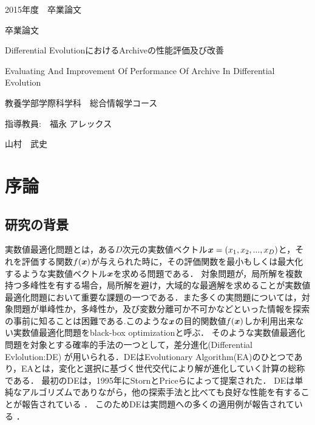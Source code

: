 \documentclass[a4paper,11pt,oneside,openany]{jsbook}
\def\vector#1{\mbox{\boldmath $#1$}}
\begin{document}
\thispagestyle{empty}
2015年度　卒業論文%
\bigskip%
\LARGE%
\begin{center}
卒業論文
\end{center}
\bigskip\bigskip\bigskip\bigskip\bigskip\bigskip\bigskip %
\begin{center} %
Differential EvolutionにおけるArchiveの性能評価及び改善
\end{center}
\large %
\begin{center}
Evaluating And Improvement Of Performance Of Archive In Differential Evolution
\end{center}
\bigskip\bigskip\bigskip\bigskip\bigskip\bigskip\bigskip\bigskip\bigskip\bigskip
\bigskip\bigskip\bigskip\bigskip\bigskip\bigskip\bigskip\bigskip\bigskip
\Large %
\begin{center}
教養学部学際科学科　総合情報学コース
\end{center}
\Large %
\begin{center}
指導教員:　福永 アレックス
\end{center}
\LARGE %
\begin{center}
山村　武史
\end{center}
\normalsize
\thispagestyle{empty}
\tableofcontents

\chapter{序論}
\section{研究の背景}
実数値最適化問題とは，ある$D$次元の実数値ベクトル$\vector{x} = (x_1, x_2, ..., x_D)$と，それを評価する関数$f(\vector{x})$が与えられた時に，その評価関数を最小もしくは最大化するような実数値ベクトル$\vector{x}$を求める問題である．
対象問題が，局所解を複数持つ多峰性を有する場合，局所解を避け，大域的な最適解を求めることが実数値最適化問題において重要な課題の一つである．また多くの実問題については，対象問題が単峰性か，多峰性か，及び変数分離可か不可かなどといった情報を探索の事前に知ることは困難である.このような$\vector{x}$の目的関数値$f(\vector{x})$しか利用出来ない実数値最適化問題をblack-box optimizationと呼ぶ．
そのような実数値最適化問題を対象とする確率的手法の一つとして，差分進化(Differential Evlolution:DE) \cite{Storn} が用いられる．DEはEvolutionary Algorithm(EA)のひとつであり，EAとは，変化と選択に基づく世代交代により解が進化していく計算の総称である．
最初のDEは，1995年にStornとPriceらによって提案された．
DEは単純なアルゴリズムでありながら，他の探索手法と比べても良好な性能を有することが報告されている
． \cite{Storn} \cite{ExDE}
このためDEは実問題への多くの適用例が報告されている \cite{ExDE} ．
\end{document}

